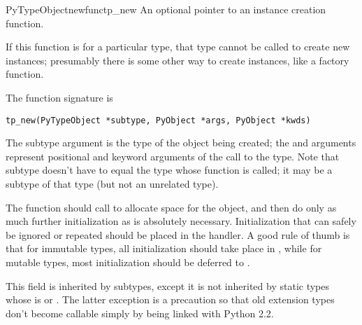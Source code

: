 \begin{cmemberdesc}{PyTypeObject}{newfunc}{tp_new}
  An optional pointer to an instance creation function.

  If this function is \NULL{} for a particular type, that type cannot
  be called to create new instances; presumably there is some other
  way to create instances, like a factory function.

  The function signature is

\begin{verbatim}
tp_new(PyTypeObject *subtype, PyObject *args, PyObject *kwds)
\end{verbatim}

  The subtype argument is the type of the object being created; the
   and  arguments represent positional and keyword
  arguments of the call to the type.  Note that subtype doesn't have
  to equal the type whose  function is called; it may
  be a subtype of that type (but not an unrelated type).

  The  function should call
   to
  allocate space for the object, and then do only as much further
  initialization as is absolutely necessary.  Initialization that can
  safely be ignored or repeated should be placed in the
   handler.  A good rule of thumb is that for
  immutable types, all initialization should take place in
  , while for mutable types, most initialization should
  be deferred to .

  This field is inherited by subtypes, except it is not inherited by
  static types whose  is \NULL{} or
  .  The latter exception is a precaution so
  that old extension types don't become callable simply by being
  linked with Python 2.2.
\end{cmemberdesc}

